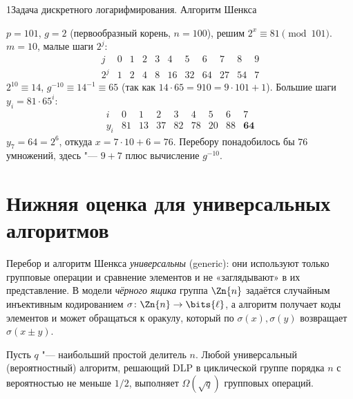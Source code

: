 \begin{lecture}{1}{Задача дискретного логарифмирования. Алгоритм Шенкса}
\begin{example}
$p = 101$, $g = 2$ (первообразный корень, $n = 100$), решим $2^x \equiv 81 \pmod{101}$.
$m = 10$, малые шаги $2^j$:
\[
\begin{array}{c|cccccccccc}
  j & 0 & 1 & 2 & 3 & 4 & 5 & 6 & 7 & 8 & 9 \\ \hline
  2^j & 1 & 2 & 4 & 8 & 16 & 32 & 64 & 27 & 54 & 7
\end{array}
\]
$2^{10} \equiv 14$, $g^{-10} \equiv 14^{-1} \equiv 65$ (так как $14 \cdot 65 = 910 = 9 \cdot 101 +
1$). Большие шаги $y_i = 81 \cdot 65^i$:
\[
\begin{array}{c|cccccccc}
  i & 0 & 1 & 2 & 3 & 4 & 5 & 6 & 7 \\ \hline
  y_i & 81 & 13 & 37 & 82 & 78 & 20 & 88 & \mathbf{64}
\end{array}
\]
$y_7 = 64 = 2^6$, откуда $x = 7 \cdot 10 + 6 = 76$. Перебору понадобилось бы $76$ умножений,
здесь "--- $9 + 7$ плюс вычисление $g^{-10}$.
\end{example}





\section{Нижняя оценка для универсальных алгоритмов}\label{l1:generic}

Перебор и алгоритм Шенкса \emph{универсальны} (generic): они используют только групповые
операции и сравнение элементов и не «заглядывают» в их представление. В модели \emph{чёрного
ящика} группа $\Zn{n}$ задаётся случайным инъективным кодированием $\sigma \colon \Zn{n} \to
\bits{\ell}$, а алгоритм получает коды элементов и может обращаться к оракулу, который по
$\sigma(x), \sigma(y)$ возвращает $\sigma(x \pm y)$.

\begin{theorem}\label{l1:shoup}
Пусть $q$ "--- наибольший простой делитель $n$. Любой универсальный (вероятностный) алгоритм,
решающий DLP в циклической группе порядка $n$ с вероятностью не меньше $1/2$, выполняет
$\Omega(\sqrt q)$ групповых операций.
\end{theorem}


\end{lecture}
